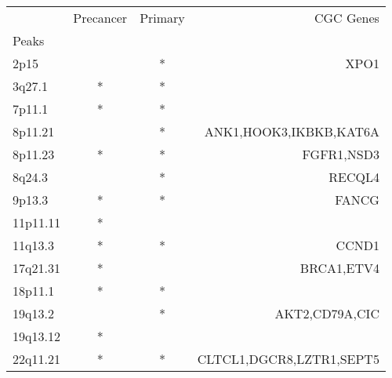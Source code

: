 \begin{tabular}{lccr}
\toprule
{} & Precancer & Primary &                 CGC Genes \\
Peaks    &           &         &                           \\
\midrule
2p15     &           &       * &                      XPO1 \\
3q27.1   &         * &       * &                           \\
7p11.1   &         * &       * &                           \\
8p11.21  &           &       * &    ANK1,HOOK3,IKBKB,KAT6A \\
8p11.23  &         * &       * &                FGFR1,NSD3 \\
8q24.3   &           &       * &                    RECQL4 \\
9p13.3   &         * &       * &                     FANCG \\
11p11.11 &         * &         &                           \\
11q13.3  &         * &       * &                     CCND1 \\
17q21.31 &         * &         &                BRCA1,ETV4 \\
18p11.1  &         * &       * &                           \\
19q13.2  &           &       * &            AKT2,CD79A,CIC \\
19q13.12 &         * &         &                           \\
22q11.21 &         * &       * &  CLTCL1,DGCR8,LZTR1,SEPT5 \\
\bottomrule
\end{tabular}
